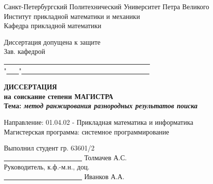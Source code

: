 \documentclass[12pt,a4paper]{report}
\begin{document}
\begin{titlepage}
\par
\vspace*{-4cm}
\begin{center}
{\large

Санкт-Петербургский Политехнический Университет Петра Великого\\
Институт прикладной математики и механики\\
Кафедра прикладной математики\\

\vspace*{0.5cm}

\begin{flushright}
Диссертация допущена к защите\\
Зав. кафедрой\ \ \ \ \ \ \ \ \ \ \ \ \ \ \ \ \ \ \ \ \ \ \ \ \ \ \ \\
\underline{ \ \ \ \ \ \ \ \ \ \ \ \ \ \ \ \ \ \ \ \ \ \ \ \ \ \ \ \ \ \ \ \ \ \ \ \ \ \ \ \ \ \ \ } \\
"\underline{ \ \ \ }"\underline{ \ \ \ \ \ \ \ \ \ \ \ \ \ \ \ \ \ \ \ \ \ \ \ \ \ \ \ \ \ \ \ \ \ \ \ \ \ }
\end{flushright}

\vspace*{2.0cm}

{\Large
  \textbf{
    ДИССЕРТАЦИЯ\\
    на соискание степени МАГИСТРА\\
  }
}
\vspace*{1cm}
\textbf{
  Тема: \emph{метод ранжирования разнородных результатов поиска}\\
}

}

\vspace*{1.5cm}

\begin{flushleft}
Направление: 01.04.02 - Прикладная математика и информатика\\
Магистерская программа: системное программирование\\
\end{flushleft}

\vspace*{1cm}

Выполнил студент гр. 63601/2 \ \ \ \ \ \ \ \ \ \ \ \ \ \ \ \ \ \ \ \ \ \ \ \ \ \ \ \ \ \ \ \ \ \ \ \ \ \underline{ \ \ \ \ \ \ \ \ \ \ \ \ \ \ \ \ \ \ \ \ \ \ \ } Толмачев А.С.\\
\vspace*{0.3cm}
Руководитель, к.ф.-м.н., доц. \ \ \ \ \ \ \ \ \ \ \ \ \ \ \ \ \ \ \ \ \ \ \ \ \ \ \ \ \ \ \ \ \ \ \ \ \ \ \underline{ \ \ \ \ \ \ \ \ \ \ \ \ \ \ \ \ \ \ \ \ \ \ \ } Иванков А.А.
\vspace*{0.5cm}


\end{center}
\end{titlepage}
\end{document}
